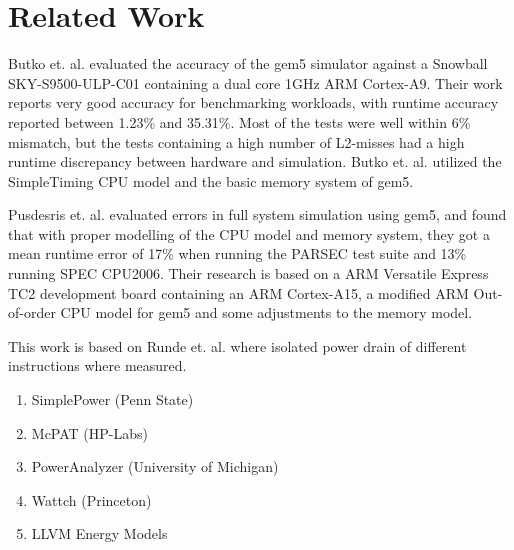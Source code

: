 \section{Related Work}

Butko et. al. \cite{butko2012accuracy} evaluated the accuracy of the gem5
simulator against a Snowball SKY-S9500-ULP-C01 containing a dual core 1GHz ARM
Cortex-A9.  Their work reports very good accuracy for benchmarking workloads,
with runtime accuracy reported between 1.23\% and 35.31\%.  Most of the tests
were well within 6\% mismatch, but the tests containing a high number of
L2-misses had a high runtime discrepancy between hardware and simulation. Butko et. al.
utilized the SimpleTiming CPU model and the basic memory system of gem5.

Pusdesris et. al. \cite{pusdesrissources} evaluated errors in full system
simulation using gem5, and found that with proper modelling of the CPU model
and memory system, they got a mean runtime error of 17\% when running the PARSEC
test suite and 13\% running SPEC CPU2006. Their research is based on a ARM
Versatile Express TC2 development board containing an ARM Cortex-A15, a modified
ARM Out-of-order CPU model for gem5 and some adjustments to the memory model.

This work is based on Runde et. al. \cite{rundehvatum2013exploring} where isolated
power drain of different instructions where measured.

\begin{enumerate}
    \item SimplePower (Penn State)
    \item McPAT (HP-Labs)
    \item PowerAnalyzer (University of Michigan)
    \item Wattch (Princeton)
    \item LLVM Energy Models
\end{enumerate}

